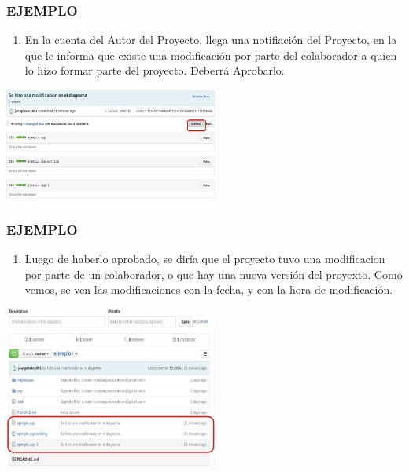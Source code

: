 \documentclass[8pt]{beamer}
\begin{document}
\begin{frame}
\frametitle{EJEMPLO}
\begin{enumerate}[23. ]
	\justifying
    \item En la cuenta del Autor del Proyecto, llega una notifiación del Proyecto, en la que le informa que existe una modificación por parte del colaborador a quien lo hizo formar parte del proyecto. Deberrá Aprobarlo.\\
\end{enumerate}
\begin{center}
\includegraphics[width=7cm]{img/b35}\\
\fontsize{6}{1}
\end{center}
\end{frame}

\begin{frame}
\frametitle{EJEMPLO}
\begin{enumerate}[24. ]
	\justifying
    \item Luego de haberlo aprobado, se diría que el proyecto tuvo una modificacion por parte de un colaborador, o que hay una nueva versión del proyexto. Como vemos, se ven las modificaciones con la fecha, y con la hora de modificación.\\
\end{enumerate}
\begin{center}
\includegraphics[width=7cm]{img/b36}\\
\fontsize{6}{1}
\end{center}
\end{frame}
\end{document}

